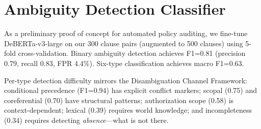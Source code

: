 \documentclass[11pt,a4paper]{article}
\begin{document}
\appendix
\section{Ambiguity Detection Classifier}
\label{sec:classifier}

As a preliminary proof of concept for automated policy auditing, we fine-tune DeBERTa-v3-large on our 300 clause pairs (augmented to 500 clauses) using 5-fold cross-validation.
Binary ambiguity detection achieves F1=0.81 (precision 0.79, recall 0.83, FPR 4.4\%).
Six-type classification achieves macro F1=0.63.

Per-type detection difficulty mirrors the Disambiguation Channel Framework:
conditional precedence (F1=0.94) has explicit conflict markers;
scopal (0.75) and coreferential (0.70) have structural patterns;
authorization scope (0.58) is context-dependent;
lexical (0.39) requires world knowledge;
and incompleteness (0.34) requires detecting \emph{absence}---what is not there.


\end{document}
